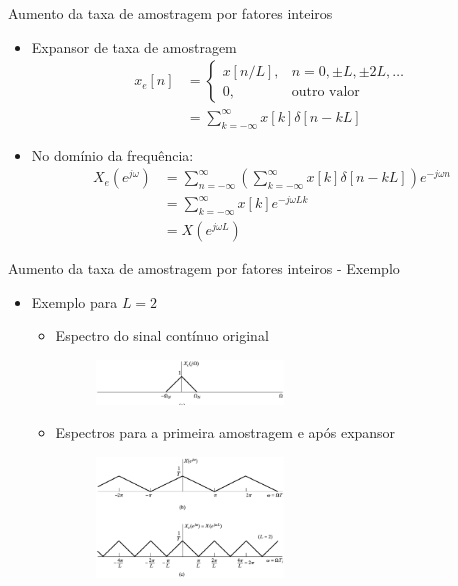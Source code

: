 \documentclass[
size=11pt,
paper=screen,
mode=present,
display=slidesnotes,
style=paintings,
nopagebreaks,
blackslide,
fleqn]{powerdot}
\begin{document}
\begin{slide}{Aumento da taxa de amostragem por fatores inteiros}
	\begin{itemize}
		\item Expansor de taxa de amostragem 
			\begin{align*}
				x_e[n] &= 
				\begin{cases}
					x[n/L],  & n= 0, \pm L, \pm 2L, \dots\\
					0, &\text{outro valor}
				\end{cases}\\
				&= \sum_{k=-\infty}^{\infty}x[k]\delta[n-kL]
			\end{align*}
		\item No domínio da frequência:
			\begin{align*}
				X_e(e^{j\omega})& = \sum_{n=-\infty}^{\infty}\left ( \sum_{k=-\infty}^{\infty}x[k]\delta[n-kL] \right ) e^{-j\omega n}\\
				 &=  \sum_{k=-\infty}^{\infty}x[k] e^{-j\omega L k}\\
				 &=  X(e^{j\omega L})
			\end{align*}
	\end{itemize}
\end{slide}

\begin{slide}{Aumento da taxa de amostragem por fatores inteiros - Exemplo}
	\begin{itemize}
		\item Exemplo para $L=2$
			\begin{itemize}
				\item Espectro do sinal contínuo original
			\begin{figure}
				\centering
				\includegraphics[width=0.5\textwidth]{figs/4-20a.eps}
		        \end{figure}
		\item Espectros para a primeira amostragem e após expansor
			\begin{figure}
				\centering
				\includegraphics[width=0.5\textwidth]{figs/4-24bc.eps}
		        \end{figure}
			\end{itemize}
	\end{itemize}
\end{slide}
\end{document}
